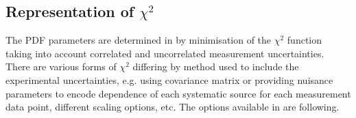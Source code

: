\subsection{Representation of $\chi^2$}
\label{sec:chi2representation}

The PDF parameters are determined in \fitter by minimisation of the
$\chi^2$ function taking into account correlated and uncorrelated measurement uncertainties.
There are various forms of $\chi^2$ differing by method used to include 
the experimental uncertainties,
e.g. using covariance matrix or providing nuisance parameters to encode dependence of 
each systematic source for each measurement data point, different scaling options, etc. 
The options available in \fitter are following.

